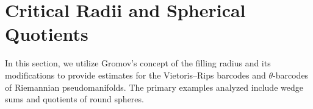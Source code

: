 
\section{Critical Radii and Spherical Quotients}\label{s:barcodes}

In this section, we utilize Gromov's concept of the filling radius and its modifications to provide estimates for the Vietoris--Rips barcodes and \(\theta\)-barcodes of Riemannian pseudomanifolds.
The primary examples analyzed include wedge sums and quotients of round spheres.




